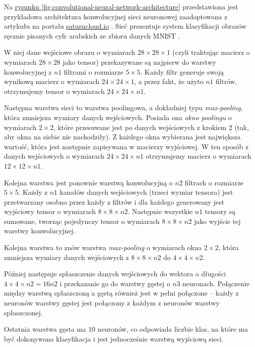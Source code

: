 Na \hyperref[fig:convolutional-neural-network-architecture]{rysunku \ref*{fig:convolutional-neural-network-architecture}} przedstawiona jest przykładowa architektura konwolucyjnej sieci neuronowej zaadoptowana z artykułu na portalu \url{saturncloud.io} \cite{saha2018comprehensive}.
Sieć prezentuje system klasyfikacji obrazów ręcznie pisanych cyfr arabskich ze zbioru danych MNIST \cite{mnist}.

W niej dane wejściowe obrazu o wymiarach $28 \times 28 \times 1$ (czyli traktując macierz o wymiarach $28 \times 28$ jako tensor) przekazywane są najpierw do warstwy konwolucyjnej z $n1$ filtrami o rozmiarze $5 \times 5$.
Każdy filtr generuje swoją wynikową macierz o wymiarach $24 \times 24 \times 1$, a przez fakt, że użyto $n1$ filtrów, otrzymujemy tensor o wymiarach $24 \times 24 \times n1$.

Następna warstwa sieci to warstwa poolingowa, a dokładniej typu \emph{max-pooling}, która zmniejsza wymiary danych wejściowych.
Posiada ona \emph{okno poolingu} o wymiarach $2 \times 2$, które przesuwane jest po danych wejściowych z krokiem $2$ (tak, aby okna na siebie nie nachodziły).
Z każdego okna wybierana jest największa wartość, która jest następnie zapisywana w macierzy wyjściowej.
W ten sposób z danych wejściowych o wymiarach $24 \times 24 \times n1$ otrzymujemy macierz o wymiarach $12 \times 12 \times n1$.

Kolejna warstwa jest ponownie warstwą konwolucyjną o $n2$ filtrach o rozmiarze $5 \times 5$.
Każdy z $n1$ kanałów danych wejściowych (trzeci wymiar tensora) jest przetwarzany osobno przez każdy z filtrów i dla każdego generowany jest wyjściowy tensor o wymiarach $8 \times 8 \times n2$.
Następnie wszystkie $n1$ tensory są sumowane, tworząc pojedynczy tensor o wymiarach $8 \times 8 \times n2$ jako wyjście tej warstwy konwolucyjnej.

Kolejna warstwa to znów warstwa \emph{max-pooling} o wymiarach okna $2 \times 2$, która zmniejsza wymiary danych wejściowych z $8 \times 8 \times n2$ do $4 \times 4 \times n2$.

Później następuje spłaszczenie danych wejściowych do wektora o długości $4 \times 4 \times n2 = 16n2$ i przekazanie go do warstwy gęstej o $n3$ neuronach.
Połączenie między warstwą spłaszczoną a gęstą również jest w pełni połączone -- każdy z neuronów warstwy gęstej jest połączony z każdym z neuronów warstwy spłaszczonej.

Ostatnia warstwa gęsta ma $10$ neuronów, co odpowiada liczbie klas, na które ma być dokonywana klasyfikacja i jest jednocześnie warstwą wyjściową sieci.

